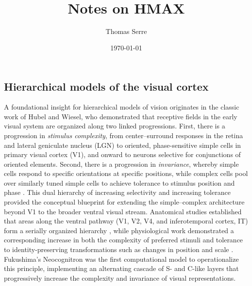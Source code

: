 \documentclass[11pt,a4paper]{article}
\title{Notes on HMAX}
\author{Thomas Serre}
\date{\today}
\begin{document}
\maketitle

\subsection{Hierarchical models of the visual cortex}

A foundational insight for hierarchical models of vision originates in the classic work of Hubel and Wiesel, who demonstrated that receptive fields in the early visual system are organized along two linked progressions. First, there is a progression in \emph{stimulus complexity}, from center--surround responses in the retina and lateral geniculate nucleus (LGN) to oriented, phase-sensitive simple cells in primary visual cortex (V1), and onward to neurons selective for conjunctions of oriented elements. Second, there is a progression in \emph{invariance}, whereby simple cells respond to specific orientations at specific positions, while complex cells pool over similarly tuned simple cells to achieve tolerance to stimulus position and phase \citep{HubelWiesel1962}. This dual hierarchy of increasing selectivity and increasing tolerance provided the conceptual blueprint for extending the simple--complex architecture beyond V1 to the broader ventral visual stream. Anatomical studies established that areas along the ventral pathway (V1, V2, V4, and inferotemporal cortex, IT) form a serially organized hierarchy \citep{FellemanVanEssen1991}, while physiological work demonstrated a corresponding increase in both the complexity of preferred stimuli and tolerance to identity-preserving transformations such as changes in position and scale \citep{Logothetis1995,DiCarlo2012}. Fukushima’s Neocognitron \citep{Fukushima1980} was the first computational model to operationalize this principle, implementing an alternating cascade of S- and C-like layers that progressively increase the complexity and invariance of visual representations.
\end{document}
